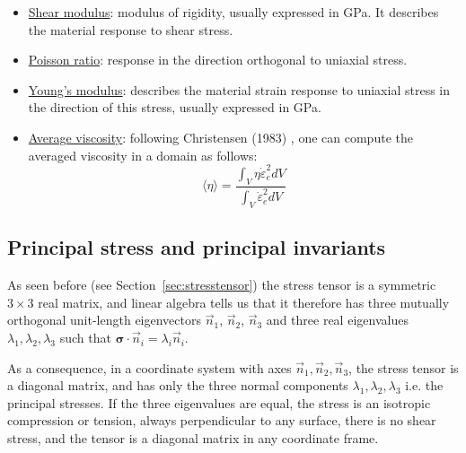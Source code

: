 \begin{itemize}
\item \underline{Shear modulus}: modulus of rigidity, usually expressed in GPa. It describes the 
material response to shear stress.

\item \underline{Poisson ratio}: response in the direction orthogonal to uniaxial stress.

\item \underline{Young's modulus}: describes the material strain response to uniaxial stress
in the direction of this stress, usually expressed in GPa.

\item \underline{Average viscosity}: following Christensen (1983) \cite{chri83b}, one can compute the averaged
viscosity in a domain as follows:
\begin{equation}
\langle \eta \rangle = \frac{\int_V \eta \dot{\varepsilon}_e^2 dV}{\int_V  \dot{\varepsilon}_e^2 dV }
\label{eq:avrgeta}
\end{equation}


\end{itemize}




\subsection{Principal stress and principal invariants} \label{sec:princ_stress}


As seen before (see Section~\ref{sec:stresstensor}) 
the stress tensor is a symmetric $3\times3$ real matrix, and linear algebra tells us that it 
therefore has three mutually orthogonal unit-length eigenvectors $\vec{n}_{1}$, $\vec{n}_{2}$, 
$\vec{n}_{3}$ and three real eigenvalues $\lambda _{1},\lambda _{2},\lambda _{3}$ 
such that ${\bm \sigma}\cdot \vec{n}_i=\lambda_{i} \vec{n}_{i}$.

As a consequence, in a coordinate system with axes $\vec{n}_{1},\vec{n}_{2},\vec{n}_{3}$, 
the stress tensor is a diagonal matrix, and has only the three normal components $\lambda _{1},\lambda _{2},\lambda _{3}$
i.e. the principal stresses. If the three eigenvalues are equal, the stress is an isotropic compression or tension, always perpendicular to any surface, there is no shear stress, and the tensor is a diagonal matrix in any coordinate frame.

